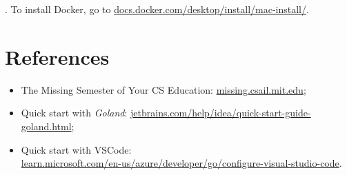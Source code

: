 \documentclass[11pt, letterpaper]{article}
\begin{document}
. To install Docker, go to \href{https://docs.docker.com/desktop/install/mac-install/}{docs.docker.com/desktop/install/mac-install/}.

\section{References}

\begin{itemize}%
\item The Missing Semester of Your CS Education: \href{https://missing.csail.mit.edu/}{missing.csail.mit.edu};
\item Quick start with \emph{Goland}: \href{https://www.jetbrains.com/help/idea/quick-start-guide-goland.html}{jetbrains.com/help/idea/quick-start-guide-goland.html};
\item Quick start with VSCode: \\ \href{https://learn.microsoft.com/en-us/azure/developer/go/configure-visual-studio-code}{learn.microsoft.com/en-us/azure/developer/go/configure-visual-studio-code}.
\end{itemize}%
\end{document}
